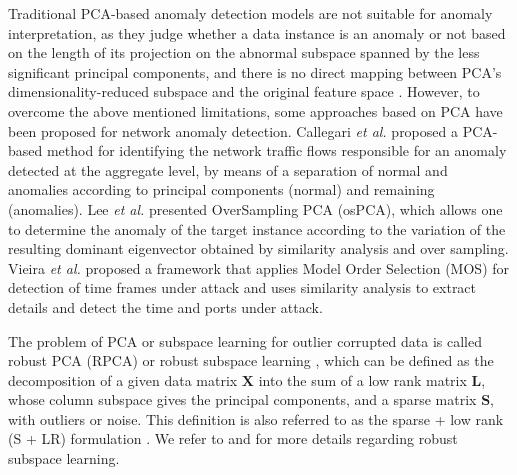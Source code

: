 \documentclass[review]{elsarticle}
\begin{document}

Traditional PCA-based anomaly detection models are not suitable for anomaly interpretation, as they judge whether a data instance is an anomaly or not based on the length of its projection on the abnormal subspace spanned by the less significant principal components, and there is no direct mapping between PCA’s dimensionality-reduced subspace and the original feature space \cite{ringberg2007sensitivity}. However, to overcome the above mentioned limitations, some approaches based on PCA have been proposed for network anomaly detection. Callegari \emph{et al.} \cite{callegari2011novel} proposed a PCA-based method for identifying the network traffic flows responsible for an anomaly detected at the aggregate level, by means of a separation of normal and anomalies according to principal components (normal) and remaining (anomalies). Lee \emph{et al.} \cite{Lee2013} presented OverSampling PCA (osPCA), which allows one to determine the anomaly of the target instance according to the variation of the resulting dominant eigenvector obtained by similarity analysis and over sampling. Vieira \emph{et al.} \cite{vieira2017model} proposed a framework that applies Model Order Selection (MOS) for detection of time frames under attack and uses similarity analysis to extract details and detect the time and ports under attack.

The problem of PCA or subspace learning for outlier corrupted data is called robust PCA (RPCA) or robust subspace learning \cite{vaswani2018robust}, which can be defined as the decomposition of a given data matrix $\textbf{X}$ into the sum of a low rank matrix $\textbf{L}$, whose column subspace gives the principal components, and a sparse matrix $\textbf{S}$, with outliers or noise. This definition is also referred to as the sparse + low rank (S + LR) formulation \cite{vaswani2018robust}. We refer to \cite{lerman2018overview} and \cite{vaswani2018robust} for more details regarding robust subspace learning. 
\end{document}

